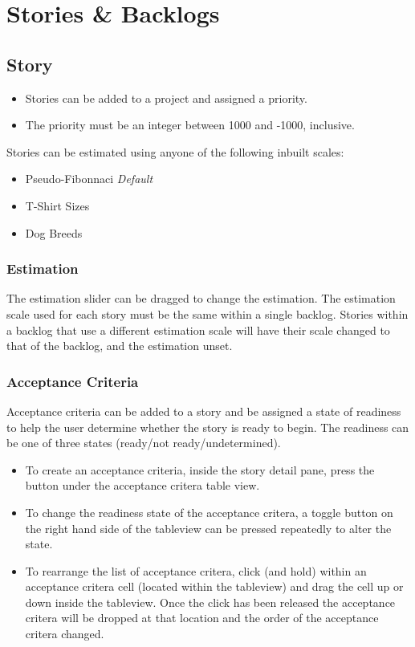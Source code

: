 \documentclass[11pt,fleqn]{book} %
\begin{document}
\section{Stories \& Backlogs}

\subsection{Story}
\begin{itemize}
  \item Stories can be added to a project and assigned a priority.
  \item The priority must be an integer between 1000 and -1000, inclusive.
\end{itemize}
Stories can be estimated using anyone of the following inbuilt scales:
\begin{itemize}
\item Pseudo-Fibonnaci \textit{Default}
\item T-Shirt Sizes
\item Dog Breeds
\end{itemize}
\subsubsection{Estimation}
The estimation slider can be dragged to change the estimation.
The estimation scale used for each story must be the same within a single backlog. Stories within a backlog
that use a different estimation scale will have their scale changed to that of the backlog, and the estimation unset.
\subsubsection{Acceptance Criteria}
Acceptance criteria can be added to a story and be assigned a state of readiness to help the user determine whether the
story is ready to begin. The readiness can be one of three states (ready/not ready/undetermined).
\begin{itemize}
  \item To create an acceptance criteria, inside the story detail pane, press the \menu{+} button under the acceptance critera table
  view.
  \item To change the readiness state of the acceptance critera, a toggle button on the right hand side of the tableview
  can be pressed repeatedly to alter the state.
  \item To rearrange the list of acceptance critera, click (and hold) within an acceptance critera cell (located within the tableview)
  and drag the cell up or down inside the tableview. Once the click has been released the acceptance critera will be
  dropped at that location and the order of the acceptance critera changed.
\end{itemize}
\end{document}
